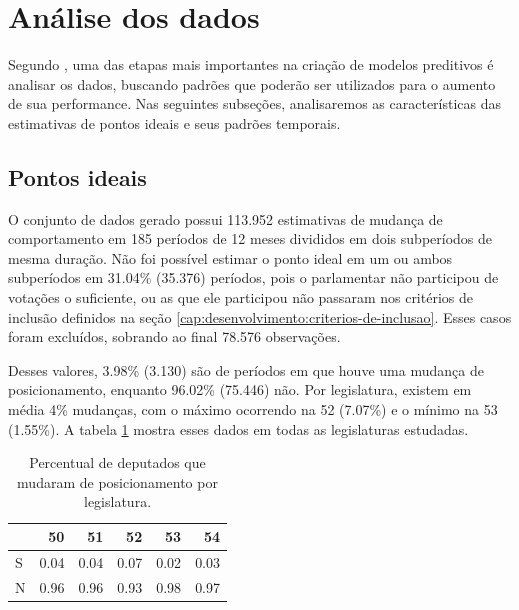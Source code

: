 \documentclass[a4paper,titlepage]{ppgi}\usepackage[]{graphicx}\usepackage[]{color}
\newenvironment{knitrout}{}{} %
\begin{document}
\section{Análise dos dados}
\label{cap:desenvolvimento:analise}

Segundo , uma das etapas mais importantes na criação de
modelos preditivos é analisar os dados, buscando padrões que poderão ser
utilizados para o aumento de sua performance. Nas seguintes subseções,
analisaremos as características das estimativas de pontos ideais e seus padrões
temporais.

\subsection{Pontos ideais}



O conjunto de dados gerado possui 113.952 estimativas de mudança
de comportamento em 185 períodos de 12 meses divididos em dois
subperíodos de mesma duração. Não foi possível estimar o ponto ideal em um ou
ambos subperíodos em 31.04\%
(35.376) períodos, pois o parlamentar não participou de
votações o suficiente, ou as que ele participou não passaram nos critérios de
inclusão definidos na seção \ref{cap:desenvolvimento:criterios-de-inclusao}. Esses casos
foram excluídos, sobrando ao final 78.576 observações.

Desses valores, 3.98\%
(3.130) são de períodos em que houve uma mudança de
posicionamento, enquanto 96.02\% (75.446) não. Por legislatura, existem em
média 4\%
mudanças, com o máximo ocorrendo na 52\textordfeminine{}
(7.07\%) e o
mínimo na 53\textordfeminine{}
(1.55\%).  A
tabela \ref{table:coalition-changes-per-legislature} mostra esses dados em
todas as legislaturas estudadas.

\begin{table}
\centering
\begin{knitrout}
\color{fgcolor}
\begin{tabular}{l|r|r|r|r|r}
\hline
  & 50 & 51 & 52 & 53 & 54\\
\hline
S & 0.04 & 0.04 & 0.07 & 0.02 & 0.03\\
\hline
N & 0.96 & 0.96 & 0.93 & 0.98 & 0.97\\
\hline
\end{tabular}


\end{knitrout}
\caption{Percentual de deputados que mudaram de posicionamento por legislatura.}
\label{table:coalition-changes-per-legislature}
\end{table}
\end{document}
